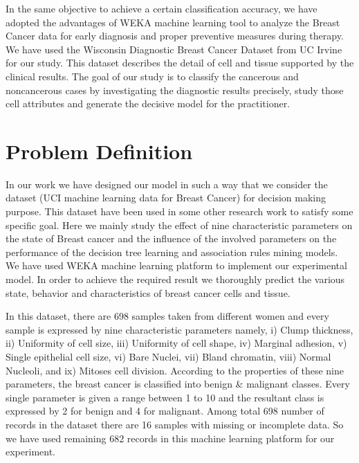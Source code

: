 \documentclass[conference]{IEEEtran}
\begin{document}
In the same objective to achieve a certain classification accuracy, we have adopted the advantages of WEKA machine learning tool to analyze the Breast Cancer data for early diagnosis and proper preventive measures during therapy. We have used the Wisconsin Diagnostic Breast Cancer  Dataset from UC Irvine\cite{IEEEhowto:uci} for our study. This dataset describes the detail of cell and tissue supported by the clinical results.  The goal of our study is to classify the cancerous and noncancerous cases by investigating the diagnostic results precisely, study those cell attributes and generate the decisive model for the practitioner.

%
% 
%
%
%

\section{Problem Definition}
In our work we have designed our model in such a way that we consider the dataset (UCI machine learning data for Breast Cancer) for decision making purpose. This dataset have been used in some other research work to satisfy some specific goal. Here we mainly study the effect of nine characteristic parameters on the state of Breast cancer and the influence of the involved parameters on the performance of the decision tree learning and association rules mining models. We have used WEKA machine learning platform to implement our experimental model. In order to achieve the required result we thoroughly predict the various state, behavior and characteristics of breast cancer cells and tissue.

In this dataset, there are 698 samples taken from different women and every sample is expressed by nine characteristic parameters namely, i) Clump thickness, ii) Uniformity of cell size, iii) Uniformity of cell shape, iv) Marginal adhesion, v) Single epithelial cell size, vi) Bare Nuclei, vii) Bland chromatin, viii) Normal Nucleoli, and ix) Mitoses cell division. According to the properties of these nine parameters, the breast cancer is classified into benign \& malignant classes. Every single parameter is given a range between 1 to 10 and the resultant class is expressed by 2 for benign and 4 for malignant. Among total 698 number of records in the dataset there are 16 samples with missing or incomplete data. So we have used remaining 682 records in this machine learning platform for our experiment.
\end{document}
